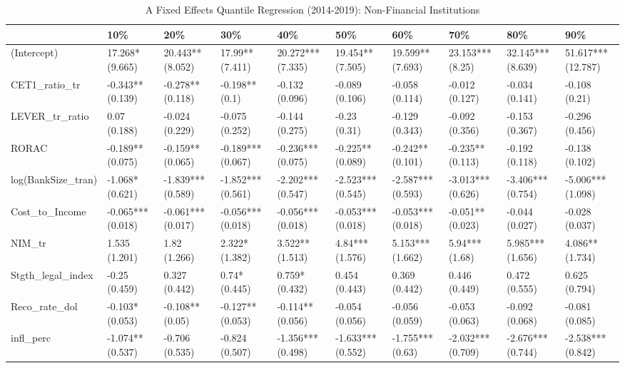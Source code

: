 \begin{table}[ht]
\centering
\caption{A Fixed Effects Quantile Regression (2014-2019): Non-Financial Institutions} 
\begingroup\small
\begin{tabular}{llllllllll}
  \toprule
 & 10\% & 20\% & 30\% & 40\% & 50\% & 60\% & 70\% & 80\% & 90\% \\ 
  \midrule
(Intercept) & 17.268* (9.665) & 20.443** (8.052) & 17.99** (7.411) & 20.272*** (7.335) & 19.454** (7.505) & 19.599** (7.693) & 23.153*** (8.25) & 32.145*** (8.639) & 51.617*** (12.787) \\ 
  CET1\_ratio\_tr & -0.343** (0.139) & -0.278** (0.118) & -0.198** (0.1) & -0.132 (0.096) & -0.089 (0.106) & -0.058 (0.114) & -0.012 (0.127) & -0.034 (0.141) & -0.108 (0.21) \\ 
  LEVER\_tr\_ratio & 0.07 (0.188) & -0.024 (0.229) & -0.075 (0.252) & -0.144 (0.275) & -0.23 (0.31) & -0.129 (0.343) & -0.092 (0.356) & -0.153 (0.367) & -0.296 (0.456) \\ 
  RORAC & -0.189** (0.075) & -0.159** (0.065) & -0.189*** (0.067) & -0.236*** (0.075) & -0.225** (0.089) & -0.242** (0.101) & -0.235** (0.113) & -0.192 (0.118) & -0.138 (0.102) \\ 
  log(BankSize\_tran) & -1.068* (0.621) & -1.839*** (0.589) & -1.852*** (0.561) & -2.202*** (0.547) & -2.523*** (0.545) & -2.587*** (0.593) & -3.013*** (0.626) & -3.406*** (0.754) & -5.006*** (1.098) \\ 
  Cost\_to\_Income & -0.065*** (0.018) & -0.061*** (0.017) & -0.056*** (0.018) & -0.056*** (0.018) & -0.053*** (0.018) & -0.053*** (0.018) & -0.051** (0.023) & -0.044 (0.027) & -0.028 (0.037) \\ 
  NIM\_tr & 1.535 (1.201) & 1.82 (1.266) & 2.322* (1.382) & 3.522** (1.513) & 4.84*** (1.576) & 5.153*** (1.662) & 5.94*** (1.68) & 5.985*** (1.656) & 4.086** (1.734) \\ 
  Stgth\_legal\_index & -0.25 (0.459) & 0.327 (0.442) & 0.74* (0.445) & 0.759* (0.432) & 0.454 (0.443) & 0.369 (0.442) & 0.446 (0.449) & 0.472 (0.555) & 0.625 (0.794) \\ 
  Reco\_rate\_dol & -0.103* (0.053) & -0.108** (0.05) & -0.127** (0.053) & -0.114** (0.056) & -0.054 (0.056) & -0.056 (0.059) & -0.053 (0.063) & -0.092 (0.068) & -0.081 (0.085) \\ 
  infl\_perc & -1.074** (0.537) & -0.706 (0.535) & -0.824 (0.507) & -1.356*** (0.498) & -1.633*** (0.552) & -1.755*** (0.63) & -2.032*** (0.709) & -2.676*** (0.744) & -2.538*** (0.842) \\ 

\end{tabular}
\end{table}
